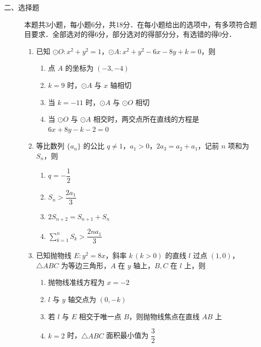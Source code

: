 \begin{description}
    \item[二、选择题] 本题共3小题，每小题6分，共18分．在每小题给出的选项中，有多项符合题目要求．全部选对的得6分，部分选对的得部分分，有选错的得0分．
    \begin{enumerate}[leftmargin=5pt]
      \addtocounter{enumi}{+8}
        \item 已知 $\odot O:x^2+y^2=1$，$\odot A:x^2+y^2-6x-8y+k=0$，则
        \begin{enumerate}[label=\Alph*.]
            \item 点 $A$ 的坐标为 $(-3,-4)$
            \item $k=9$ 时，$\odot A$ 与 $x$ 轴相切
            \item 当 $k=-11$ 时，$\odot A$ 与 $\odot O$ 相切
            \item 当 $\odot O$ 与 $\odot A$ 相交时，两交点所在直线的方程是 $6x+8y-k-2=0$
        \end{enumerate}

        \item 等比数列 $\{a_n\}$ 的公比 $q\neq1$，$a_1>0$，$2a_3=a_2+a_1$，记前 $n$ 项和为 $S_n$，则
        \begin{enumerate}[label=\Alph*.]
            \item $q=-\dfrac{1}{2}$
            \item $S_n>\dfrac{2a_1}{3}$
            \item $2S_{n+2}=S_{n+1}+S_n$
            \item $\displaystyle\sum_{k=1}^{n}S_k>\dfrac{2na_1}{3}$
        \end{enumerate}

        \item 已知抛物线 $E:y^2=8x$，斜率 $k\,(k>0)$ 的直线 $l$ 过点 $(1,0)$，$\triangle ABC$ 为等边三角形，$A$ 在 $y$ 轴上，$B,C$ 在 $l$ 上，则
        \begin{enumerate}[label=\Alph*.]
            \item 抛物线准线方程为 $x=-2$
            \item $l$ 与 $y$ 轴交点为 $(0,-k)$
            \item 若 $l$ 与 $E$ 相交于唯一点 $B$，则抛物线焦点在直线 $AB$ 上
            \item $k=2$ 时，$\triangle ABC$ 面积最小值为 $\dfrac{3}{2}$
        \end{enumerate}
    \end{enumerate}
\end{description}

